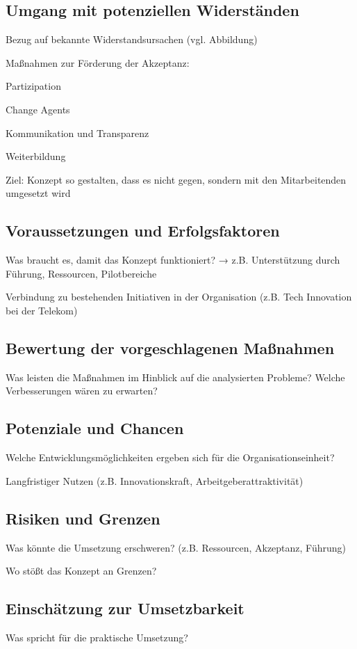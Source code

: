 \documentclass[12pt,a4paper]{article}
\begin{document}
	\subsection{Umgang mit potenziellen Widerständen}
	Bezug auf bekannte Widerstandsursachen (vgl. Abbildung)
	
	Maßnahmen zur Förderung der Akzeptanz:
	
	Partizipation
	
	Change Agents
	
	Kommunikation und Transparenz
	
	Weiterbildung
	
	Ziel: Konzept so gestalten, dass es nicht gegen, sondern mit den Mitarbeitenden umgesetzt wird
	
	\subsection{Voraussetzungen und Erfolgsfaktoren}
	Was braucht es, damit das Konzept funktioniert?
	→ z.B. Unterstützung durch Führung, Ressourcen, Pilotbereiche
	
	Verbindung zu bestehenden Initiativen in der Organisation (z.B. Tech  Innovation bei der Telekom)
	\subsection{Bewertung der vorgeschlagenen Maßnahmen}
	
	Was leisten die Maßnahmen im Hinblick auf die analysierten Probleme?
	Welche Verbesserungen wären zu erwarten?
	\subsection{Potenziale und Chancen}
	Welche Entwicklungsmöglichkeiten ergeben sich für die Organisationseinheit?
	
	Langfristiger Nutzen (z.B. Innovationskraft, Arbeitgeberattraktivität)
	\subsection{Risiken und Grenzen}
	Was könnte die Umsetzung erschweren? (z.B. Ressourcen, Akzeptanz, Führung)
	
	Wo stößt das Konzept an Grenzen?
	
	\subsection{Einschätzung zur Umsetzbarkeit}
	Was spricht für die praktische Umsetzung?
	
\end{document}
